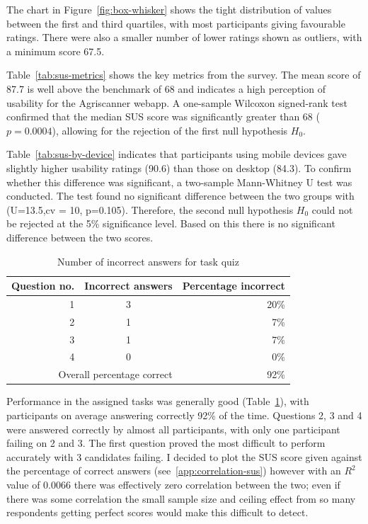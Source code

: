 The chart in Figure~\ref{fig:box-whisker} shows the tight distribution of values
between the first and third quartiles, with most participants giving favourable
ratings. There were also a smaller number of lower ratings shown as outliers,
with a minimum score 67.5.

Table~\ref{tab:sus-metrics} shows the key metrics from the survey. The mean
score of 87.7 is well above the benchmark of 68 and indicates a high perception
of usability for the Agriscanner webapp. A one-sample Wilcoxon signed-rank test
confirmed that the median SUS score was significantly greater than 68
(\(p=0.0004\)), allowing for the rejection of the first null hypothesis \(H_0\).

Table~\ref{tab:sus-by-device} indicates that participants using mobile devices
gave slightly higher usability ratings (90.6) than those on desktop (84.3). To
confirm whether this difference was significant, a two-sample Mann-Whitney U
test was conducted. The test found no significant difference between the two
groups with (U=13.5,cv = 10, p=0.105). Therefore, the second null hypothesis
\(H_0\) could not be rejected at the 5\% significance level. Based on this there
is no significant difference between the two scores.


\begin{table}[H]
  \centering
  \begin{tabular}{r c r}
    \hline
    Question no. & Incorrect answers & Percentage incorrect\\
    \hline
    1 & 3 & 20\%\\
    2 & 1 & 7\% \\
    3 & 1 & 7\% \\
    4 & 0 & 0\% \\
    \hline
    \multicolumn{2}{r}{Overall percentage correct} & 92\% \\
    \hline
  \end{tabular}
  \caption{Number of incorrect answers for task quiz}
  \label{tab:correct-metrics}
\end{table}

Performance in the assigned tasks was generally good
(Table~\ref{tab:correct-metrics}), with participants on average answering
correctly 92\% of the time. Questions 2, 3 and 4 were answered correctly by
almost all participants, with only one participant failing on 2 and 3. The first
question proved the most difficult to perform accurately with 3 candidates
failing. I decided to plot the SUS score given against the percentage of correct
answers (see~\ref{app:correlation-sus}) however with an $R^2$ value of 0.0066
there was effectively zero correlation between the two; even if there was some
correlation the small sample size and ceiling effect from so many respondents
getting perfect scores would make this difficult to detect.

